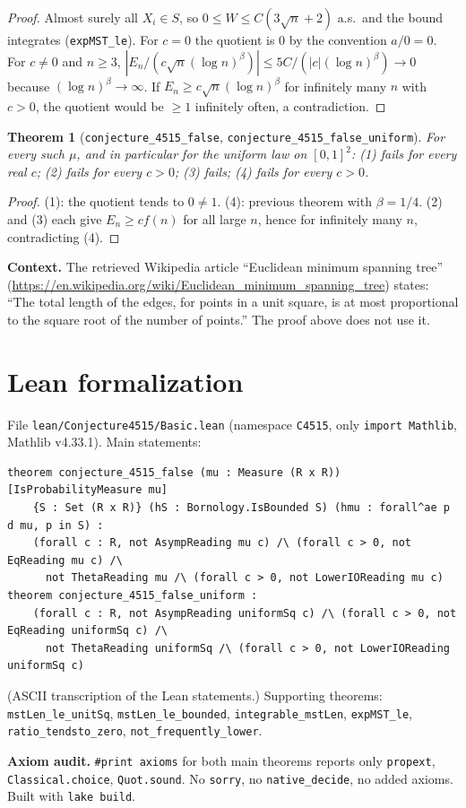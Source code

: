\documentclass[11pt]{article}
\newtheorem{theorem}{Theorem}
\theoremstyle{definition}
\begin{document}
\begin{proof}
Almost surely all $X_i\in S$, so $0\le W\le C(3\sqrt n+2)$ a.s.\ and the bound integrates
(\texttt{expMST\_le}). For $c=0$ the quotient is $0$ by the convention $a/0=0$. For $c\ne0$ and
$n\ge3$, $|E_n/(c\sqrt n(\log n)^\beta)|\le 5C/(|c|(\log n)^\beta)\to0$ because
$(\log n)^\beta\to\infty$. If $E_n\ge c\sqrt n(\log n)^\beta$ for infinitely many $n$ with
$c>0$, the quotient would be $\ge1$ infinitely often, a contradiction.
\end{proof}

\begin{theorem}[\texttt{conjecture\_4515\_false}, \texttt{conjecture\_4515\_false\_uniform}]
For every such $\mu$, and in particular for the uniform law on $[0,1]^2$: (1) fails for every
real $c$; (2) fails for every $c>0$; (3) fails; (4) fails for every $c>0$.
\end{theorem}

\begin{proof}
(1): the quotient tends to $0\ne1$. (4): previous theorem with $\beta=1/4$. (2) and (3) each
give $E_n\ge c f(n)$ for all large $n$, hence for infinitely many $n$, contradicting (4).
\end{proof}

\textbf{Context.} The retrieved Wikipedia article ``Euclidean minimum spanning tree''
(\url{https://en.wikipedia.org/wiki/Euclidean_minimum_spanning_tree}) states: ``The total length
of the edges, for points in a unit square, is at most proportional to the square root of the
number of points.'' The proof above does not use it.

\section{Lean formalization}

File \texttt{lean/Conjecture4515/Basic.lean} (namespace \texttt{C4515}, only
\texttt{import Mathlib}, Mathlib v4.33.1). Main statements:
\begin{verbatim}
theorem conjecture_4515_false (mu : Measure (R x R)) [IsProbabilityMeasure mu]
    {S : Set (R x R)} (hS : Bornology.IsBounded S) (hmu : forall^ae p d mu, p in S) :
    (forall c : R, not AsympReading mu c) /\ (forall c > 0, not EqReading mu c) /\
      not ThetaReading mu /\ (forall c > 0, not LowerIOReading mu c)
theorem conjecture_4515_false_uniform :
    (forall c : R, not AsympReading uniformSq c) /\ (forall c > 0, not EqReading uniformSq c) /\
      not ThetaReading uniformSq /\ (forall c > 0, not LowerIOReading uniformSq c)
\end{verbatim}
(ASCII transcription of the Lean statements.) Supporting theorems: \texttt{mstLen\_le\_unitSq},
\texttt{mstLen\_le\_bounded}, \texttt{integrable\_mstLen}, \texttt{expMST\_le},
\texttt{ratio\_tendsto\_zero}, \texttt{not\_frequently\_lower}.

\textbf{Axiom audit.} \texttt{\#print axioms} for both main theorems reports only
\texttt{propext}, \texttt{Classical.choice}, \texttt{Quot.sound}. No \texttt{sorry}, no
\texttt{native\_decide}, no added axioms. Built with \texttt{lake build}.
\end{document}
